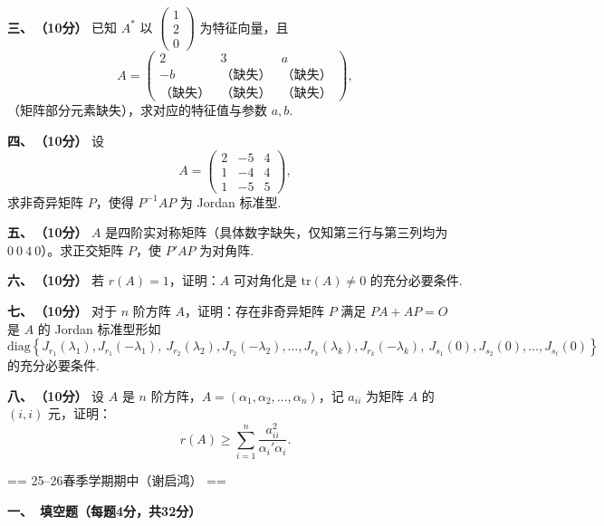 \textbf{三、\,（10分）}
已知 $A^*$ 以 $\begin{pmatrix}1\\2\\0\end{pmatrix}$ 为特征向量，且
\[
A=\begin{pmatrix}2&3&a\\-b&\text{（缺失）}&\text{（缺失）}\\\text{（缺失）}&\text{（缺失）}&\text{（缺失）}\end{pmatrix},
\]
（矩阵部分元素缺失），求对应的特征值与参数 $a,b$.

\textbf{四、\,（10分）}
设
\[
A = \begin{pmatrix} 2 & -5 & 4 \\ 1 & -4 & 4 \\ 1 & -5 & 5 \end{pmatrix},
\]
求非奇异矩阵 $P$，使得 $P^{-1}AP$ 为 Jordan 标准型.

\textbf{五、\,（10分）}
$A$ 是四阶实对称矩阵（具体数字缺失，仅知第三行与第三列均为 $0\ 0\ 4\ 0$）。求正交矩阵 $P$，使 $P'AP$ 为对角阵.

\textbf{六、\,（10分）}
若 $r(A)=1$，证明：$A$ 可对角化是 $\mathrm{tr}(A)\neq 0$ 的充分必要条件.

\textbf{七、\,（10分）}
对于 $n$ 阶方阵 $A$，证明：存在非奇异矩阵 $P$ 满足 $PA+AP=O$ 是 $A$ 的 Jordan 标准型形如
\[
\mathrm{diag}\left\{J_{r_1}(\lambda_1),J_{r_1}(-\lambda_1),\ J_{r_2}(\lambda_2),J_{r_2}(-\lambda_2),\dots,J_{r_k}(\lambda_k),J_{r_k}(-\lambda_k),\ J_{s_1}(0),J_{s_2}(0),\dots,J_{s_t}(0)\right\}
\]
的充分必要条件.

\textbf{八、\,（10分）}
设 $A$ 是 $n$ 阶方阵，$A=(\alpha_1,\alpha_2,\dots,\alpha_n)$，记 $a_{ii}$ 为矩阵 $A$ 的 $(i,i)$ 元，证明：
\[
r(A)\ge \sum_{i=1}^n \frac{a_{ii}^2}{\alpha_i'\alpha_i}.
\]


== 25--26春季学期期中（谢启鸿） ==

\textbf{一、\ 填空题（每题4分，共32分）}

